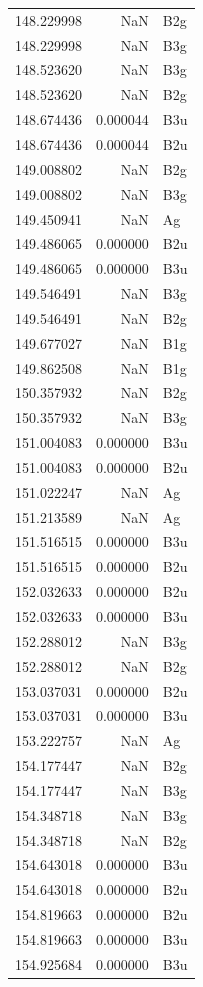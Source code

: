 \begin{longtable}{rrl}
148.229998 & NaN & B2g \\
148.229998 & NaN & B3g \\
148.523620 & NaN & B3g \\
148.523620 & NaN & B2g \\
148.674436 & 0.000044 & B3u \\
148.674436 & 0.000044 & B2u \\
149.008802 & NaN & B2g \\
149.008802 & NaN & B3g \\
149.450941 & NaN & Ag \\
149.486065 & 0.000000 & B2u \\
149.486065 & 0.000000 & B3u \\
149.546491 & NaN & B3g \\
149.546491 & NaN & B2g \\
149.677027 & NaN & B1g \\
149.862508 & NaN & B1g \\
150.357932 & NaN & B2g \\
150.357932 & NaN & B3g \\
151.004083 & 0.000000 & B3u \\
151.004083 & 0.000000 & B2u \\
151.022247 & NaN & Ag \\
151.213589 & NaN & Ag \\
151.516515 & 0.000000 & B3u \\
151.516515 & 0.000000 & B2u \\
152.032633 & 0.000000 & B2u \\
152.032633 & 0.000000 & B3u \\
152.288012 & NaN & B3g \\
152.288012 & NaN & B2g \\
153.037031 & 0.000000 & B2u \\
153.037031 & 0.000000 & B3u \\
153.222757 & NaN & Ag \\
154.177447 & NaN & B2g \\
154.177447 & NaN & B3g \\
154.348718 & NaN & B3g \\
154.348718 & NaN & B2g \\
154.643018 & 0.000000 & B3u \\
154.643018 & 0.000000 & B2u \\
154.819663 & 0.000000 & B2u \\
154.819663 & 0.000000 & B3u \\
154.925684 & 0.000000 & B3u \\

\end{longtable}
